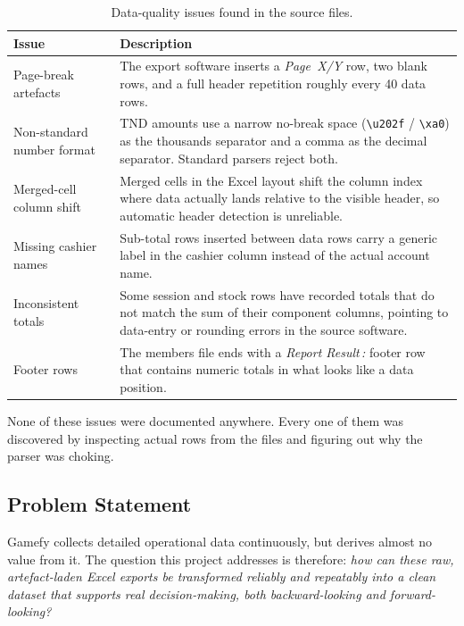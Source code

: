 \documentclass[12pt, a4paper]{report}
\begin{document}
\begin{table}[H]
  \centering
  \caption{Data-quality issues found in the source files.\label{tab:dq}}
  \begin{tabular}{p{3.5cm} p{9.5cm}}
    \toprule
    \textbf{Issue} & \textbf{Description} \\
    \midrule
    Page-break artefacts
      & The export software inserts a \textit{Page~X/Y} row, two blank rows, and
        a full header repetition roughly every 40 data rows. \\[4pt]
    Non-standard number format
      & TND amounts use a narrow no-break space (\texttt{\textbackslash u202f}
        / \texttt{\textbackslash xa0}) as the thousands separator and a comma
        as the decimal separator. Standard parsers reject both. \\[4pt]
    Merged-cell column shift
      & Merged cells in the Excel layout shift the column index where data
        actually lands relative to the visible header, so automatic header
        detection is unreliable. \\[4pt]
    Missing cashier names
      & Sub-total rows inserted between data rows carry a generic label in the
        cashier column instead of the actual account name. \\[4pt]
    Inconsistent totals
      & Some session and stock rows have recorded totals that do not match the
        sum of their component columns, pointing to data-entry or rounding
        errors in the source software. \\[4pt]
    Footer rows
      & The members file ends with a \textit{Report Result\,:} footer row that
        contains numeric totals in what looks like a data position. \\
    \bottomrule
  \end{tabular}
\end{table}

None of these issues were documented anywhere. Every one of them was discovered
by inspecting actual rows from the files and figuring out why the parser was
choking.

\subsection{Problem Statement}

Gamefy collects detailed operational data continuously, but derives almost no
value from it. The question this project addresses is therefore:
\textit{how can these raw, artefact-laden Excel exports be transformed reliably
and repeatably into a clean dataset that supports real decision-making, both
backward-looking and forward-looking?}
\end{document}
